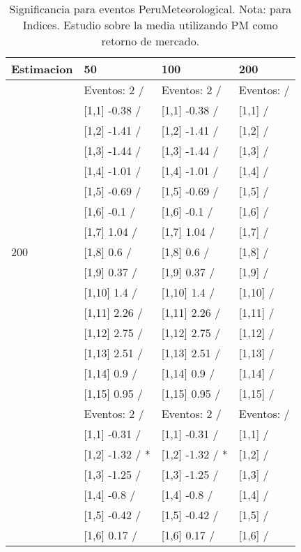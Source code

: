 \begin{table}

\caption{Significancia para eventos PeruMeteorological. Nota: para Indices. Estudio sobre la media utilizando PM como retorno de mercado.}
\centering
\begin{tabular}[t]{llll}
\toprule
Estimacion & 50 & 100 & 200\\
\midrule
 & Eventos:  2 / & Eventos:  2 / & Eventos:   /\\
 & {}[1,1] -0.38  / & {}[1,1] -0.38  / & {}[1,1]  /\\
 & {}[1,2] -1.41  / & {}[1,2] -1.41  / & {}[1,2]  /\\
 & {}[1,3] -1.44  / & {}[1,3] -1.44  / & {}[1,3]  /\\
 & {}[1,4] -1.01  / & {}[1,4] -1.01  / & {}[1,4]  /\\
\addlinespace
 & {}[1,5] -0.69  / & {}[1,5] -0.69  / & {}[1,5]  /\\
 & {}[1,6] -0.1  / & {}[1,6] -0.1  / & {}[1,6]  /\\
 & {}[1,7] 1.04  / & {}[1,7] 1.04  / & {}[1,7]  /\\
200 & {}[1,8] 0.6  / & {}[1,8] 0.6  / & {}[1,8]  /\\
 & {}[1,9] 0.37  / & {}[1,9] 0.37  / & {}[1,9]  /\\
\addlinespace
 & {}[1,10] 1.4  / & {}[1,10] 1.4  / & {}[1,10]  /\\
 & {}[1,11] 2.26  / & {}[1,11] 2.26  / & {}[1,11]  /\\
 & {}[1,12] 2.75  / & {}[1,12] 2.75  / & {}[1,12]  /\\
 & {}[1,13] 2.51  / & {}[1,13] 2.51  / & {}[1,13]  /\\
 & {}[1,14] 0.9  / & {}[1,14] 0.9  / & {}[1,14]  /\\
\addlinespace
 & {}[1,15] 0.95  / & {}[1,15] 0.95  / & {}[1,15]  /\\
 & Eventos:  2 / & Eventos:  2 / & Eventos:   /\\
 & {}[1,1] -0.31  / & {}[1,1] -0.31  / & {}[1,1]  /\\
 & {}[1,2] -1.32  / * & {}[1,2] -1.32  / * & {}[1,2]  /\\
 & {}[1,3] -1.25  / & {}[1,3] -1.25  / & {}[1,3]  /\\
\addlinespace
 & {}[1,4] -0.8  / & {}[1,4] -0.8  / & {}[1,4]  /\\
 & {}[1,5] -0.42  / & {}[1,5] -0.42  / & {}[1,5]  /\\
 & {}[1,6] 0.17  / & {}[1,6] 0.17  / & {}[1,6]  /\\

\end{tabular}
\end{table}

